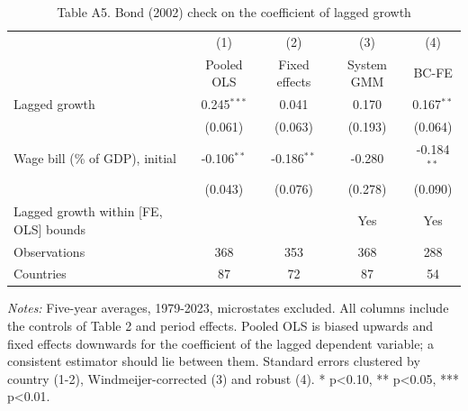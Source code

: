 \begin{table}[htbp]\centering\footnotesize
\providecommand{\sym}[1]{\ensuremath{^{#1}}}
\caption{Table A5. Bond (2002) check on the coefficient of lagged growth}\label{tab:TableA5_bond_check}
\begin{tabular}{l*{4}{c}}
\toprule
 & (1) & (2) & (3) & (4) \\
 & Pooled OLS & Fixed effects & System GMM & BC-FE \\
\midrule
Lagged growth & 0.245\sym{***} & 0.041 & 0.170 & 0.167\sym{**} \\
 & (0.061) & (0.063) & (0.193) & (0.064) \\
Wage bill (\% of GDP), initial & -0.106\sym{**} & -0.186\sym{**} & -0.280 & -0.184\sym{**} \\
 & (0.043) & (0.076) & (0.278) & (0.090) \\
\midrule
Lagged growth within [FE, OLS] bounds &  &  & Yes & Yes \\
Observations & 368 & 353 & 368 & 288 \\
Countries & 87 & 72 & 87 & 54 \\
\bottomrule
\end{tabular}
\begin{minipage}{0.95\linewidth}\vspace{4pt}\scriptsize \textit{Notes:} Five-year averages, 1979-2023, microstates excluded. All columns include the controls of Table 2 and period effects. Pooled OLS is biased upwards and fixed effects downwards for the coefficient of the lagged dependent variable; a consistent estimator should lie between them. Standard errors clustered by country (1-2), Windmeijer-corrected (3) and robust (4). * p<0.10, ** p<0.05, *** p<0.01.\end{minipage}
\end{table}
